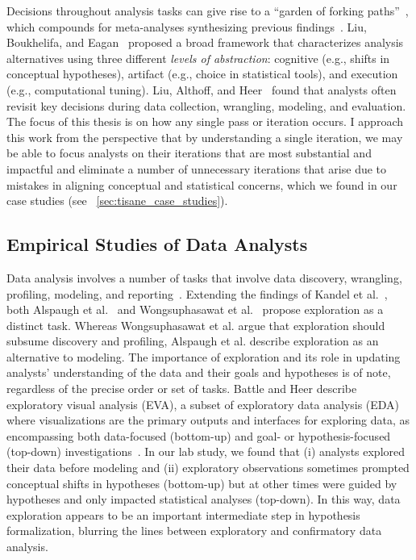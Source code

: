Decisions throughout analysis tasks can give rise to a ``garden of forking
paths''~\cite{gelman2013garden}, which compounds for meta-analyses synthesizing
previous findings~\cite{kale2019decision}. Liu, Boukhelifa, and
Eagan~\cite{liu2019understanding} proposed a broad framework that characterizes
analysis alternatives using three different \textit{levels of abstraction}:
cognitive (e.g., shifts in conceptual hypotheses), artifact (e.g., choice in
statistical tools), and execution (e.g., computational tuning). Liu, Althoff,
and Heer~\cite{liu2019paths} found that analysts often revisit key decisions
during data collection, wrangling, modeling, and evaluation. The focus of this
thesis is on how any single pass or iteration occurs. I approach this work from
the perspective that by understanding a single iteration, we may be able to
focus analysts on their iterations that are most substantial and impactful and
eliminate a number of unnecessary iterations that arise due to mistakes in
aligning conceptual and statistical concerns, which we found in our case studies
(see ~\autoref{sec:tisane_case_studies}).

\subsection{Empirical Studies of Data Analysts}
Data analysis involves a number of tasks that involve data discovery, wrangling,
profiling, modeling, and reporting~\cite{kandel2012enterprise}. Extending the findings of
Kandel et al.~\cite{kandel2012enterprise}, both Alspaugh et al.~\cite{alspaugh2018futzing} and
Wongsuphasawat et al.~\cite{wongsuphasawat2019EDAgoals}
propose exploration as a distinct task.
Whereas Wongsuphasawat et al. argue that exploration should subsume
discovery and profiling, Alspaugh et al. describe exploration as an alternative
to modeling. The importance of exploration and its role in updating analysts'
understanding of the data and their goals and hypotheses is of note, regardless
of the precise order or set of tasks. Battle and Heer describe exploratory
visual analysis (EVA), a subset of exploratory data analysis (EDA) where
visualizations are the primary outputs and interfaces for exploring data, as
encompassing both data-focused (bottom-up) and goal- or hypothesis-focused
(top-down) investigations~\cite{battle2019EVA}. In our lab study, we found that
(i) analysts explored their data before modeling and (ii) exploratory
observations sometimes prompted conceptual shifts in hypotheses (bottom-up) but
at other times were guided by hypotheses and only impacted statistical
analyses (top-down). In this way, data exploration appears to be an important
intermediate step in hypothesis formalization, blurring the lines between
exploratory and confirmatory data analysis. 

